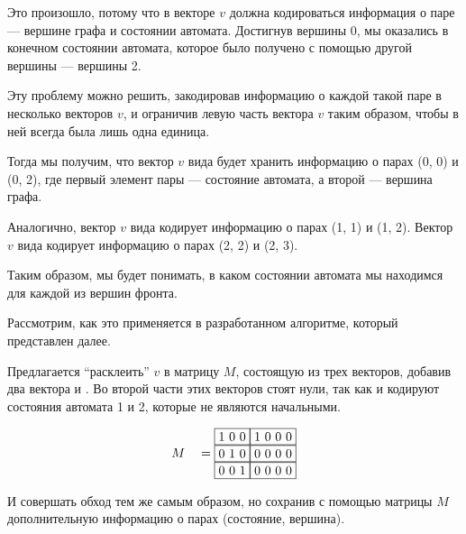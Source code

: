 \begin{example}
Это произошло, потому что в векторе $v$ должна кодироваться информация о паре --- вершине графа и состоянии автомата.
Достигнув вершины 0, мы оказались в конечном состоянии автомата, которое было получено с помощью другой вершины --- вершины 2.

Эту проблему можно решить, закодировав информацию о каждой такой паре в несколько векторов $v$, и ограничив левую
часть вектора $v$ таким образом, чтобы в ней всегда была лишь одна единица.

Тогда мы получим, что вектор $v$ вида   будет хранить информацию о парах (0, 0) и (0, 2),
где первый элемент пары --- состояние автомата, а второй --- вершина графа.

Аналогично, вектор $v$ вида   кодирует информацию о парах (1, 1) и (1, 2).
Вектор $v$ вида   кодирует информацию о парах (2, 2) и (2, 3).

Таким образом, мы будет понимать, в каком состоянии автомата мы находимся для каждой из вершин фронта.

Рассмотрим, как это применяется в разработанном алгоритме, который представлен далее.

Предлагается ``расклеить'' $v$ в матрицу $M$, состоящую из трех векторов, добавив два вектора   и  .
Во второй части этих векторов стоят нули, так как  и  кодируют состояния автомата 1 и 2, которые не являются начальными.

\begin{alignat*}{7}
  & &&M &&=\begin{matrix}
    \fbox{1 0 0} \fbox{1 0 0 0} \\ 
    \fbox{0 1 0} \fbox{0 0 0 0} \\
    \fbox{0 0 1} \fbox{0 0 0 0}
        \end{matrix}
\end{alignat*}

И совершать обход тем же самым образом, но сохранив с помощью матрицы $M$ дополнительную информацию о парах (состояние, вершина).


\end{example}
